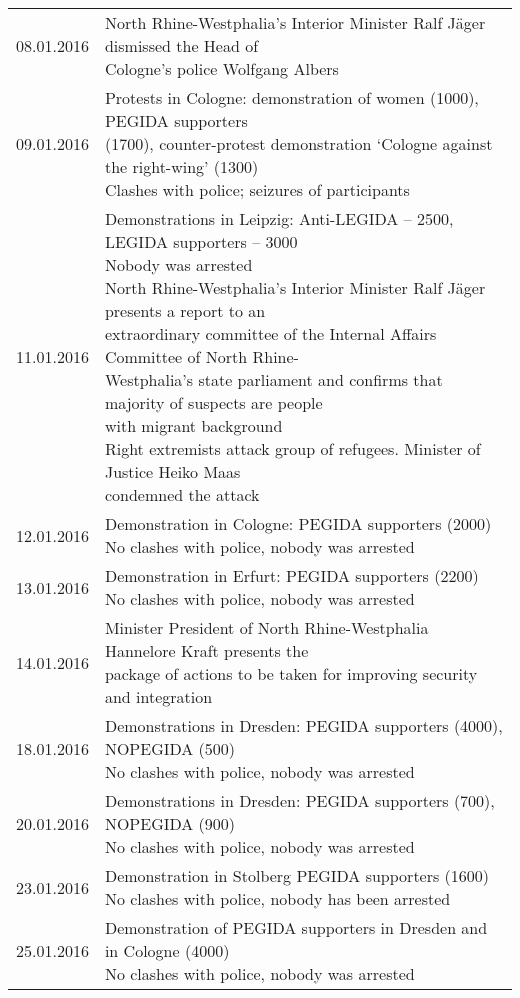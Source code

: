 \begin{table}[ht]
\begin{adjustbox}{width=0.9\textwidth}
\begin{tabular}{ l  l }
			08.01.2016 & \makecell[l]{North Rhine-Westphalia’s Interior Minister Ralf Jäger dismissed the Head of\\ Cologne’s police Wolfgang Albers} \\
			09.01.2016 & \makecell[l]{Protests in Cologne: demonstration of women (1000), PEGIDA supporters\\ (1700), counter-protest demonstration ‘Cologne against the right-wing’ (1300)\\ Clashes with police; seizures of participants} \\
			11.01.2016 & \makecell[l]{Demonstrations in Leipzig: Anti-LEGIDA -- 2500, LEGIDA supporters -- 3000\\ Nobody was arrested\\North Rhine-Westphalia’s Interior Minister Ralf Jäger presents a report to an\\ extraordinary committee of the Internal Affairs Committee of North Rhine-\\Westphalia’s state parliament and confirms that majority of suspects are people\\ with migrant background \\ Right extremists attack group of refugees. Minister of Justice Heiko Maas\\ condemned the attack}\\
			12.01.2016 & \makecell[l]{Demonstration in Cologne: PEGIDA supporters (2000)\\ No clashes with police, nobody was arrested}\\
			13.01.2016 & \makecell[l]{Demonstration in Erfurt: PEGIDA supporters (2200)\\ No clashes with police, nobody was arrested} \\
			14.01.2016 & \makecell[l]{Minister President of North Rhine-Westphalia Hannelore Kraft presents the\\ package of actions to be taken for improving security and integration} \\
			18.01.2016 & \makecell[l]{Demonstrations in Dresden: PEGIDA supporters (4000), NOPEGIDA (500)\\ No clashes with police, nobody was arrested} \\
			20.01.2016 & \makecell[l]{Demonstrations in Dresden: PEGIDA supporters (700), NOPEGIDA (900)\\ No clashes with police, nobody was arrested} \\
			23.01.2016 & \makecell[l]{Demonstration in Stolberg PEGIDA supporters (1600)\\No clashes with police, nobody has been arrested} \\
			25.01.2016 & \makecell[l]{Demonstration of PEGIDA supporters in Dresden and in Cologne (4000) \\ No clashes with police, nobody was arrested} \\
			\bottomrule
		\end{tabular}%
	\end{adjustbox}
\end{table}

